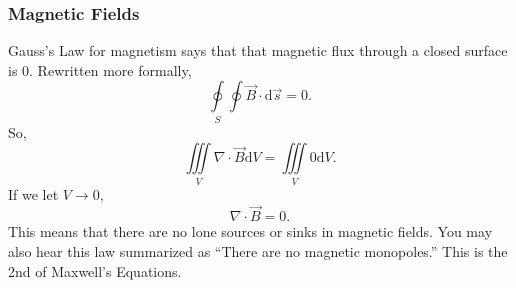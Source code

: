 \subsubsection{Magnetic Fields}
\noindent
Gauss's Law for magnetism says that that magnetic flux through a closed surface is 0. Rewritten more formally, 
\begin{equation*}
	\oint\limits_{S}\oint{\vec{B} \cdot \mathrm{d}\vec{s}} = 0.
\end{equation*}
So, 
\begin{equation*}
	\iiint\limits_{V}{\nabla \cdot \vec{B}\mathrm{d}V} = \iiint\limits_{V}{0\mathrm{d}V}.
\end{equation*}
If we let $V \to 0$, 
\begin{equation*}
	\nabla \cdot \vec{B} = 0.
\end{equation*}
This means that there are no lone sources or sinks in magnetic fields. You may also hear this law summarized as ``There are no magnetic monopoles.'' This is the 2nd of Maxwell's Equations.